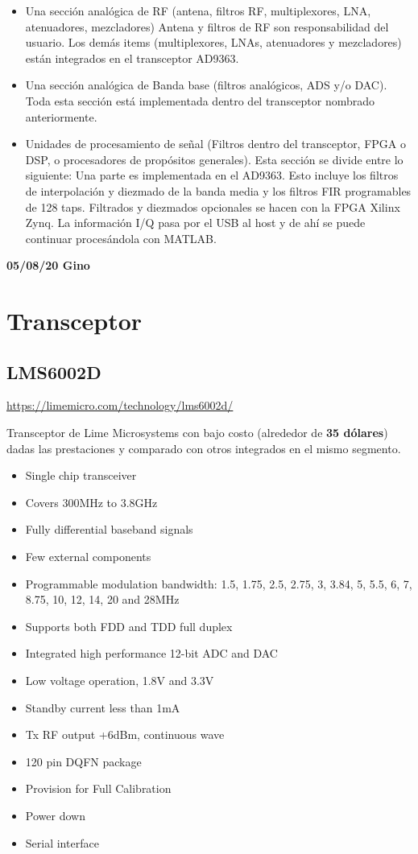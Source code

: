\documentclass[a4paper,12pt]{report} %
\begin{document}
\begin{itemize}
	\item Una sección analógica de RF (antena, filtros RF, multiplexores, LNA, atenuadores, mezcladores)
		\subitem Antena y filtros de RF son responsabilidad del usuario.
		\subitem Los demás items (multiplexores, LNAs, atenuadores y mezcladores) están integrados en el transceptor AD9363.
		
	\item Una sección analógica de Banda base (filtros analógicos, ADS y/o DAC).
		\subitem Toda esta sección está implementada dentro del transceptor nombrado anteriormente.
		 
	\item Unidades de procesamiento de señal (Filtros dentro del transceptor, FPGA o DSP, o procesadores de propósitos generales). Esta sección se divide entre lo siguiente:
		\subitem Una parte es implementada en el AD9363. Esto  incluye los filtros de interpolación y diezmado de la banda media y los filtros FIR programables de 128 taps.
		\subitem Filtrados y diezmados opcionales se hacen con la FPGA Xilinx Zynq.
		\subitem La información I/Q pasa por el USB al host y de ahí se puede continuar procesándola con MATLAB.
\end{itemize}

\textbf{05/08/20 Gino}
\section{Transceptor}

\subsection{LMS6002D}

\url{https://limemicro.com/technology/lms6002d/}

Transceptor de Lime Microsystems con bajo costo (alrededor de \textbf{35 dólares}) dadas las prestaciones y comparado con otros integrados en el mismo segmento. 

\begin{itemize}
	\item Single chip transceiver
	\item Covers 300MHz to 3.8GHz
	\item Fully differential baseband signals
	\item Few external components
	\item Programmable modulation bandwidth: 1.5, 1.75, 2.5, 2.75, 3, 3.84, 5, 5.5, 6, 7, 8.75, 10, 12, 14, 20 and 28MHz
	\item Supports both FDD and TDD full duplex
	\item Integrated high performance 12-bit ADC and DAC
	\item Low voltage operation, 1.8V and 3.3V
	\item Standby current less than 1mA
	\item Tx RF output +6dBm, continuous wave
	\item 120 pin DQFN package
	\item Provision for Full Calibration
	\item Power down
	\item Serial interface
\end{itemize}
\end{document}
